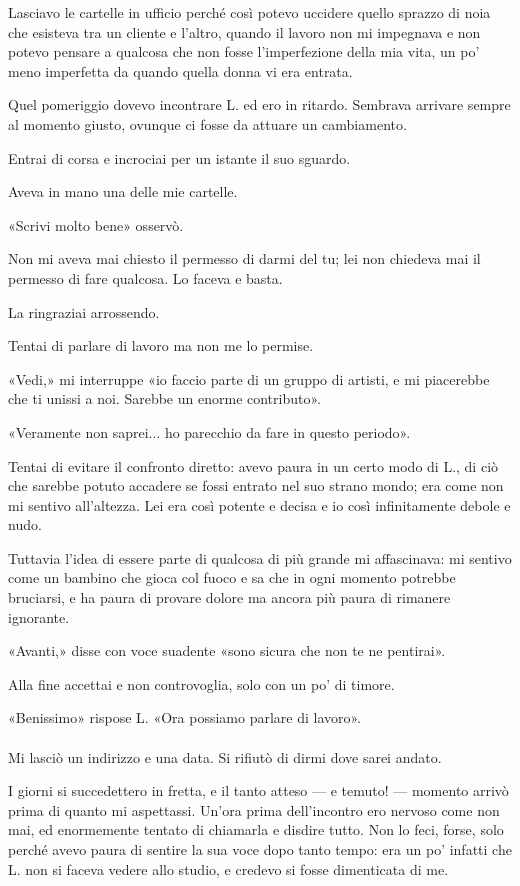 \documentclass[a4paper,12pt]{book}
\begin{document}
Lasciavo le cartelle in ufficio perché così potevo uccidere quello sprazzo di
noia che esisteva tra un cliente e l'altro, quando il lavoro non mi impegnava
e non potevo pensare a qualcosa che non fosse l'imperfezione della mia vita,
un po' meno imperfetta da quando quella donna vi era entrata.

Quel pomeriggio dovevo incontrare L. ed ero in ritardo. Sembrava arrivare sempre
al momento giusto, ovunque ci fosse da attuare un cambiamento.

Entrai di corsa e incrociai per un istante il suo sguardo.

Aveva in mano una delle mie cartelle.

«Scrivi molto bene» osservò.

Non mi aveva mai chiesto il permesso di darmi del tu; lei non chiedeva mai
il permesso di fare qualcosa. Lo faceva e basta.

La ringraziai arrossendo.

Tentai di parlare di lavoro ma non me lo permise.

«Vedi,» mi interruppe «io faccio parte di un gruppo di artisti, e mi
piacerebbe che ti unissi a noi. Sarebbe un enorme contributo».

«Veramente non saprei... ho parecchio da fare in questo periodo».

Tentai di evitare il confronto diretto: avevo paura in un certo modo di L., di
ciò che sarebbe potuto accadere se fossi entrato nel suo strano mondo; era come
non mi sentivo all'altezza. Lei era così potente e decisa e io così
infinitamente debole e nudo.

Tuttavia l'idea di essere parte di qualcosa di più grande mi affascinava: mi
sentivo come un bambino che gioca col fuoco e sa che in ogni momento potrebbe
bruciarsi, e ha paura di provare dolore ma ancora più paura di rimanere
ignorante.

«Avanti,» disse con voce suadente «sono sicura che non te ne pentirai».

Alla fine accettai e non controvoglia, solo con un po' di timore.

«Benissimo» rispose L. «Ora possiamo parlare di lavoro».

\paragraph{}
Mi lasciò un indirizzo e una data. Si rifiutò di dirmi dove sarei andato.

I giorni si succedettero in fretta, e il tanto atteso --- e temuto! --- momento
arrivò prima di quanto mi aspettassi. Un'ora prima dell'incontro ero nervoso
come non mai, ed enormemente tentato di chiamarla e disdire tutto. Non lo feci,
forse, solo perché avevo paura di sentire la sua voce dopo tanto tempo: era un
po' infatti che L. non si faceva vedere allo studio, e credevo si fosse
dimenticata di me.
\end{document}
